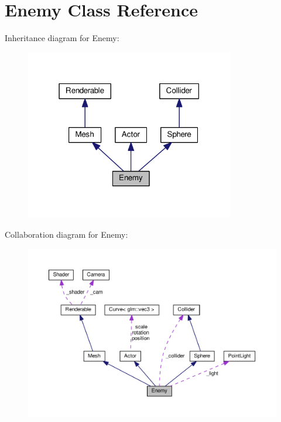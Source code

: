 \hypertarget{class_enemy}{}\section{Enemy Class Reference}
\label{class_enemy}


Inheritance diagram for Enemy\+:\nopagebreak
\begin{figure}[H]
\begin{center}
\leavevmode
\includegraphics[width=259pt]{class_enemy__inherit__graph}
\end{center}
\end{figure}


Collaboration diagram for Enemy\+:\nopagebreak
\begin{figure}[H]
\begin{center}
\leavevmode
\includegraphics[width=350pt]{class_enemy__coll__graph}
\end{center}
\end{figure}
